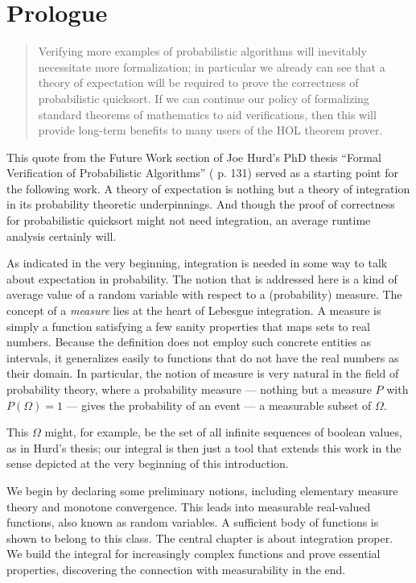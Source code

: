 \chapter{Prologue}
\label{cha:pro}


\begin{quote}
  Verifying more examples of probabilistic algorithms will inevitably
  necessitate more formalization; in particular we already can see
  that a theory of expectation will be required to prove the
  correctness of probabilistic quicksort. If we can continue our
  policy of formalizing standard theorems of mathematics to aid
  verifications, then this will provide long-term benefits to many
  users of the HOL theorem prover.      
\end{quote}

This quote from the Future Work section of Joe Hurd's PhD thesis
``Formal Verification of Probabilistic Algorithms'' (\cite{hurd2002}
p. 131) 
served as a starting point for the following work. A theory of
expectation is nothing but a theory of integration in its probability
theoretic underpinnings. And though the proof of correctness for
probabilistic quicksort might not need integration, an average runtime
analysis certainly will.  

As indicated in the very beginning, integration is needed in some way
to talk about expectation in probability. The notion that is addressed
here is a kind of average value of a random variable with respect to a
(probability) measure. The concept of a \textit{measure} lies at the
heart of Lebesgue integration. A measure is simply a function
satisfying a few sanity properties that maps sets to real numbers.
Because the definition does not employ such concrete entities as
intervals, it generalizes easily to functions that do not have the
real numbers as their domain. In particular, the notion of measure is
very natural in the field of probability theory, where a probability
measure --- nothing but a measure $P$ with $P(\Omega)=1$ --- gives the
probability of an event --- a measurable subset of $\Omega$.

This $\Omega$ might, for example, be the set of all infinite sequences
of boolean values, as in Hurd's thesis\cite{hurd2002}; our integral is
then just a tool that extends this work in the sense depicted at the
very beginning of this introduction. 

We begin by declaring some preliminary notions, including
elementary measure theory and monotone convergence. This leads into
measurable real-valued functions, also known as random variables. A
sufficient body of functions is shown to belong to this class. 
The central chapter is about integration proper. We build the integral
for increasingly complex functions and prove essential properties,
discovering the connection with measurability in the end. 

